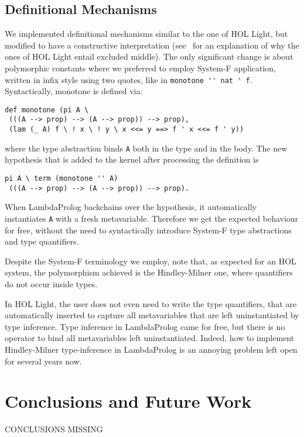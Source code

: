 \documentclass[preprint]{sigplanconf}
\begin{document}
\subsection{Definitional Mechanisms}

We implemented definitional mechanisms similar to the one of HOL Light, but modified to have a constructive interpretation (see~\cite{arthan} for an explanation of why the ones of HOL Light entail excluded middle). The only significant change is about polymorphic constants where we preferred to employ System-F application, written in infix style using two quotes, like in \verb+monotone '' nat ' f+. Syntactically, monotone is defined via:

{\small
\begin{verbatim}
def monotone (pi A \
 (((A --> prop) --> (A --> prop)) --> prop),
 (lam (_ A) f \ ! x \ ! y \ x <<= y ==> f ' x <<= f ' y))
\end{verbatim}
}

where the type abstraction binds \verb+A+ both in the type and in the body.
The new hypothesis that is added to the kernel after processing the definition
is
{\small \begin{verbatim}
pi A \ term (monotone '' A) 
 (((A --> prop) --> (A --> prop)) --> prop).
\end{verbatim}}
When LambdaProlog backchains over the hypothesis, it automatically instantiates \verb+A+ with a fresh metavariable. Therefore we get the expected behaviour for free, without the need to syntactically introduce System-F type abstractions and type quantifiers.

Despite the System-F terminology we employ, note that, as expected for an HOL system, the polymorphism achieved is the Hindley-Milner one, where quantifiers do not occur inside types.

In HOL Light, the user does not even need to write the type quantifiers, that
are automatically inserted to capture all metavariables that are left uninstantiated by type inference. Type inference in LambdaProlog came for free, but there is no operator to bind all metavariables left uninstantiated. Indeed, how to implement Hindley-Milner type-inference in LambdaProlog is an annoying problem left open for several years now.

\section{Conclusions and Future Work}

CONCLUSIONS MISSING
\end{document}

